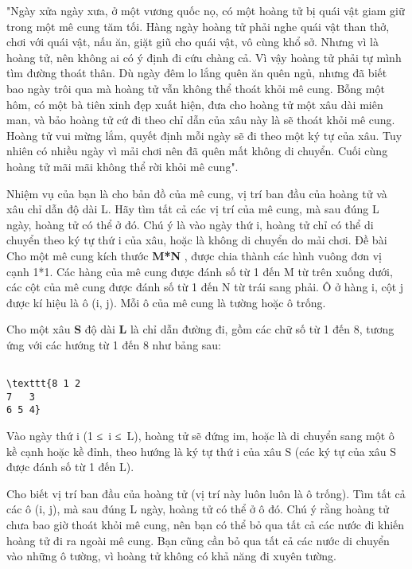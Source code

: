 "Ngày xửa ngày xưa, ở một vương quốc nọ, có một hoàng tử bị quái vật giam giữ trong một mê cung tăm tối. Hàng ngày hoàng tử phải nghe quái vật than thở, chơi với quái vật, nấu ăn, giặt giũ cho quái vật, vô cùng khổ sở. Nhưng vì là hoàng tử, nên không ai có ý định đi cứu chàng cả. Vì vậy hoàng tử phải tự mình tìm đường thoát thân. Dù ngày đêm lo lắng quên ăn quên ngủ, nhưng đã biết bao ngày trôi qua mà hoàng tử vẫn không thể thoát khỏi mê cung. Bỗng một hôm, có một bà tiên xinh đẹp xuất hiện, đưa cho hoàng tử một xâu dài miên man, và bảo hoàng tử cứ đi theo chỉ dẫn của xâu này là sẽ thoát khỏi mê cung. Hoàng tử vui mừng lắm, quyết định mỗi ngày sẽ đi theo một ký tự của xâu. Tuy nhiên có nhiều ngày vì mải chơi nên đã quên mất không di chuyển. Cuối cùng hoàng tử mãi mãi không thể rời khỏi mê cung".

Nhiệm vụ của bạn là cho bản đồ của mê cung, vị trí ban đầu của hoàng tử và xâu chỉ dẫn độ dài L. Hãy tìm tất cả các vị trí của mê cung, mà sau đúng L ngày, hoàng tử có thể ở đó. Chú ý là vào ngày thứ i, hoàng tử chỉ có thể di chuyển theo ký tự thứ i của xâu, hoặc là không di chuyển do mải chơi.
Đề bài
Cho một mê cung kích thước \textbf{ M*N } , được chia thành các hình vuông đơn vị cạnh 1*1. Các hàng của mê cung được đánh số từ 1 đến M từ trên xuống dưới, các cột của mê cung được đánh số từ 1 đến N từ trái sang phải. Ô ở hàng i, cột j được kí hiệu là ô (i, j). Mỗi ô của mê cung là tường hoặc ô trống.

Cho một xâu \textbf{ S } độ dài \textbf{ L } là chỉ dẫn đường đi, gồm các chữ số từ 1 đến 8, tương ứng với các hướng từ 1 đến 8 như bảng sau:
\begin{verbatim}

\texttt{8 1 2
7   3
6 5 4}\end{verbatim}

Vào ngày thứ i (1 ≤ i ≤ L), hoàng tử sẽ đứng im, hoặc là di chuyển sang một ô kề cạnh hoặc kề đỉnh, theo hướng là ký tự thứ i của xâu S (các ký tự của xâu S được đánh số từ 1 đến L).

Cho biết vị trí ban đầu của hoàng tử (vị trí này luôn luôn là ô trống). Tìm tất cả các ô (i, j), mà sau đúng L ngày, hoàng tử có thể ở ô đó. Chú ý rằng hoàng tử chưa bao giờ thoát khỏi mê cung, nên bạn có thể bỏ qua tất cả các nước đi khiến hoàng tử đi ra ngoài mê cung. Bạn cũng cần bỏ qua tất cả các nước di chuyển vào những ô tường, vì hoàng tử không có khả năng đi xuyên tường.